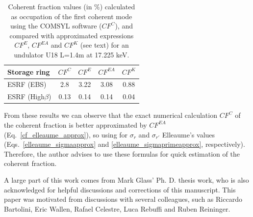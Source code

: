 \documentclass{iucr}              %
\begin{document}
\begin{table}
\caption{Coherent fraction values (in $\%$) calculated as occupation of the first coherent mode using the COMSYL software ($CF^C$), and compared with approximated expressions $CF^E$, $CF^{EA}$ and $CF^K$ (see text) for an undulator U18 L=1.4m at 17.225 keV.}
\begin{tabular}{lcccc}      %

 Storage ring    & $CF^C$       & $CF^{E}$      & $CF^{EA}$ & $CF^K$    \\
\hline
 ESRF (EBS)              & 2.8  & 3.22 & 3.08  & 0.88  \\
 ESRF (High$\beta$)      & 0.13 & 0.14 & 0.14  & 0.04   \\
\end{tabular}
\label{table:CFid16}
\end{table}

From these results we can observe that the exact numerical calculation $CF^C$ of the coherent fraction is better approximated by $CF^{EA}$ (Eq.~\ref{cf_elleaume_approx}), so using for $\sigma_r$ and $\sigma_{r'}$ Elleaume's values (Eqs.~\ref{elleaume_sigmaapprox} and \ref{elleaume_sigmaprimeapprox}, respectively). Therefore, the author advises to use these formulas for quick estimation of the coherent fraction. 




A large part of this work comes from Mark Glass' Ph. D. thesis work, who is also acknowledged for helpful discussions and corrections of this manuscript. This paper was motivated from discussions with several colleagues, such as Riccardo Bartolini, Eric Wallen, Rafael Celestre, Luca Rebuffi and Ruben Reininger.


\end{document}
